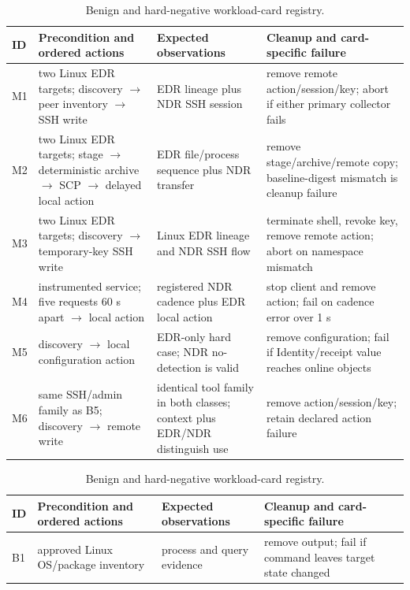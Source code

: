 \begin{table}[!t]
\caption{Linux-only malicious scenario-card registry. Actions use two isolated EDR targets;
success receipts remain offline.}
\label{tab:scenario-cards}
\centering
\scriptsize
\begin{tabular}{p{}p{}p{}p{}}
\toprule
\textbf{ID} & \textbf{Precondition and ordered actions} & \textbf{Expected observations} & \textbf{Cleanup and card-specific failure} \\
\midrule
M1 & two Linux EDR targets; discovery $\rightarrow$ peer inventory $\rightarrow$ SSH write & EDR lineage plus NDR SSH session & remove remote action/session/key; abort if either primary collector fails \\
M2 & two Linux EDR targets; stage $\rightarrow$ deterministic archive $\rightarrow$ SCP $\rightarrow$ delayed local action & EDR file/process sequence plus NDR transfer & remove stage/archive/remote copy; baseline-digest mismatch is cleanup failure \\
M3 & two Linux EDR targets; discovery $\rightarrow$ temporary-key SSH write & Linux EDR lineage and NDR SSH flow & terminate shell, revoke key, remove remote action; abort on namespace mismatch \\
M4 & instrumented service; five requests 60 s apart $\rightarrow$ local action & registered NDR cadence plus EDR local action & stop client and remove action; fail on cadence error over 1 s \\
M5 & discovery $\rightarrow$ local configuration action & EDR-only hard case; NDR no-detection is valid & remove configuration; fail if Identity/receipt value reaches online objects \\
M6 & same SSH/admin family as B5; discovery $\rightarrow$ remote write & identical tool family in both classes; context plus EDR/NDR distinguish use & remove action/session/key; retain declared action failure \\
\bottomrule
\end{tabular}
\vspace{8pt}
\caption{Benign and hard-negative workload-card registry.}
\label{tab:benign-cards}
\centering
\scriptsize
\begin{tabular}{p{}p{}p{}p{}}
\toprule
\textbf{ID} & \textbf{Precondition and ordered actions} & \textbf{Expected observations} & \textbf{Cleanup and card-specific failure} \\
\midrule
B1 & approved Linux OS/package inventory & process and query evidence & remove output; fail if command leaves target state changed \\

\end{tabular}
\end{table}
